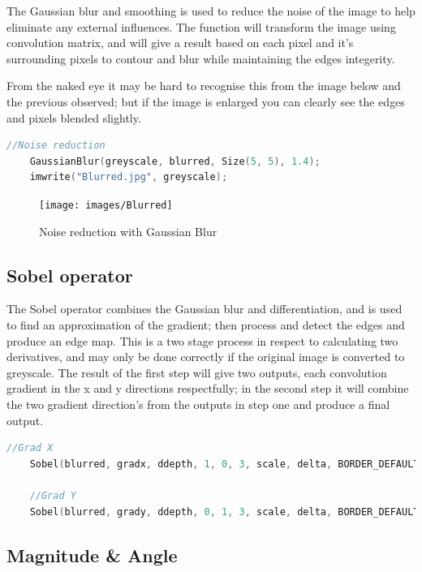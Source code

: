 \documentclass[a4paper, 10pt]{article}
\begin{document}
The Gaussian blur and smoothing is used to reduce the noise of the image to help eliminate any external influences. The function will transform the image using convolution matrix, and will give a result based on each pixel and it's surrounding pixels to contour and blur while maintaining the edges integerity.

From the naked eye it may be hard to recognise this from the image below and the previous observed; but if the image is enlarged you can clearly see the edges and pixels blended slightly.

\begin{lstlisting}[language = C++]
	//Noise reduction
	GaussianBlur(greyscale, blurred, Size(5, 5), 1.4);
	imwrite("Blurred.jpg", greyscale);		
\end{lstlisting}

\begin{figure}[H]
  \texttt{[image: images/Blurred]}
  \caption{Noise reduction with Gaussian Blur}
  \label{fig:Noise reduction with Gaussian Blur}
\end{figure}


\subsection{Sobel operator}

The Sobel operator combines the Gaussian blur and differentiation, and is used to find an approximation of the gradient; then process and detect the edges and produce an edge map. This is a two stage process in respect to calculating two derivatives, and may only be done correctly if the original image is converted to greyscale. The result of the first step will give two outputs, each convolution gradient in the x and y directions respectfully; in the second step it will combine the two gradient direction's from the outputs in step one and produce a final output.

\begin{lstlisting}[language = C++]
	//Grad X
	Sobel(blurred, gradx, ddepth, 1, 0, 3, scale, delta, BORDER_DEFAULT);

	//Grad Y
	Sobel(blurred, grady, ddepth, 0, 1, 3, scale, delta, BORDER_DEFAULT);
\end{lstlisting}

\clearpage
\subsection{Magnitude \& Angle}
\end{document}
